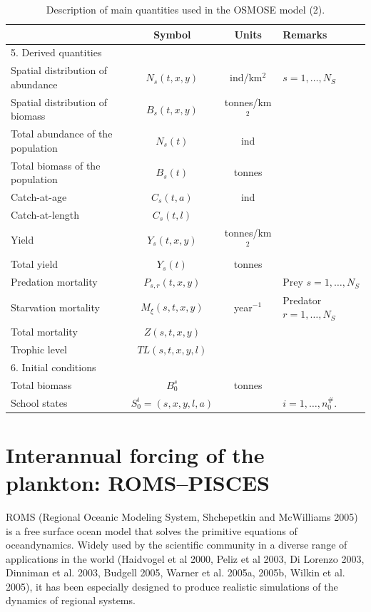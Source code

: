 \begin{table}
\caption{Description of main quantities used in the OSMOSE model (2).}
\label{tab:osmose-vars2}
\centering \footnotesize 
\begin{tabular}{|p{5cm}|c|c|p{4cm}|}
\hline & Symbol & Units & Remarks\\
\hline \multicolumn{4}{|l|}{5. Derived quantities}\\
\hline Spatial distribution of abundance & $N_s(t, x, y)$ & ind/km$^2$ & $s = 1, \ldots, N_S$ \\
Spatial distribution of biomass & $B_s(t, x, y)$ & tonnes/km$^2$ & \\	
\hline Total abundance of the population &  $N_s(t)$ & ind & \\
Total biomass of the population & $B_s(t)$ & tonnes & \\	
\hline Catch-at-age & $C_s(t, a)$ & ind  & \\
Catch-at-length & $C_s(t, l)$ &&\\
\hline Yield & $Y_s(t, x, y)$ & tonnes/km$^2$ & \\	
\hline Total yield	& $Y_s(t)$ &tonnes & \\	
\hline Predation mortality & $P_{s,r}(t, x, y)$ && Prey $s = 1, \ldots, N_S$ \\
Starvation mortality & $M_\xi(s, t, x, y)$ & year$^{-1}$ & Predator $r = 1, \ldots, N_S$\\
Total mortality	& $Z(s, t, x, y)$ && \\ 
\hline Trophic level & $TL(s,t,x,y,l)$ && \\		
\hline \multicolumn{4}{|l|}{6. Initial conditions}\\
\hline Total biomass & $B_0^s$ & tonnes & \\	
\hline School states & $S_0^i = (s, x, y, l, a)$ && $i = 1, \ldots,n_0^\#$.\\
\hline
\end{tabular} 
\end{table}

\section{Interannual forcing of the plankton: ROMS--PISCES}


ROMS (Regional Oceanic Modeling System, Shchepetkin and McWilliams 2005) is a free surface ocean model that solves the primitive equations of oceandynamics. Widely used by the scientific community in a diverse range of applications in the world (Haidvogel et al 2000, Peliz et al 2003, Di Lorenzo 2003, Dinniman et al. 2003, Budgell 2005, Warner et al. 2005a, 2005b, Wilkin et al. 2005), it has been especially designed to produce realistic simulations of the dynamics of regional systems. 

